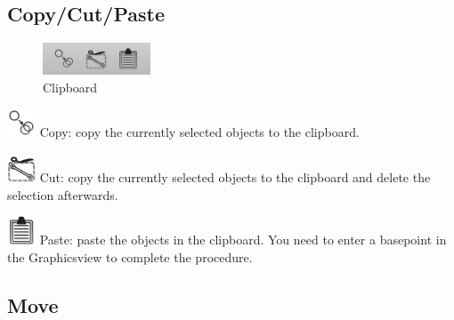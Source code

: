 \documentclass[a4paper,11pt]{report}
\begin{document}
\subsection{Copy/Cut/Paste}
\begin{minipage}[h]{4cm}
\begin{figure}[H]
\begin{center}
\includegraphics[scale=0.6]{../pictures/clipboardtoolbar.png}
\caption{Clipboard}
\label{pic:clipboardtoolbar}
\end{center}
\end{figure}
\end{minipage}
\begin{minipage}[h]{\textwidth-4cm}
\begin{trivlist}
	\item[] \includegraphics[scale = 0.5]{../../icons/copy.png} Copy: copy the currently selected objects to the clipboard.
	\item[] \includegraphics[scale = 0.5]{../../icons/cut.png} Cut: copy the currently selected objects to the clipboard and delete the selection afterwards.
	\item[] \includegraphics[scale = 0.5]{../../icons/paste.png} Paste: paste the objects in the clipboard. You need to enter a basepoint in the Graphicsview to complete the procedure. 
\end{trivlist}
\end{minipage}

\subsection{Move}
\end{document}
